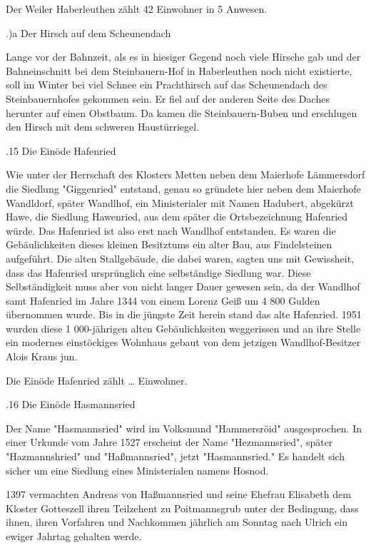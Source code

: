Der Weiler Haberleuthen zählt 42 Einwohner in 5 Anwesen.

.)a Der Hirsch auf dem Scheunendach

Lange vor der Bahnzeit, als es in hiesiger Gegend noch viele Hirsche gab und der
Bahneinschnitt bei dem Steinbauern-Hof in Haberleuthen noch nicht existierte,
soll im Winter bei viel Schnee ein Prachthirsch auf das Scheunendach des
Steinbauernhofes gekommen sein. Er fiel auf der anderen Seite des Daches
herunter auf einen Obstbaum. Da kamen die Steinbauern-Buben und erschlugen den
Hirsch mit dem schweren Haustürriegel.

.15 Die Einöde Hafenried

Wie unter der Herrschaft des Klosters Metten neben dem Maierhofe Lämmersdorf die
Siedlung "Giggenried" entstand, genau so gründete hier neben dem Maierhofe
Wandldorf, später Wandlhof, ein Ministerialer mit Namen Hadubert, abgekürzt
Hawe, die Siedlung Hawenried, aus dem später die Ortsbezeichnung Hafenried
würde. Das Hafenried ist also erst nach Wandlhof entstanden. Es waren die
Gebäulichkeiten dieses kleinen Besitztums ein alter Bau, aus Findelsteinen
aufgeführt. Die alten Stallgebäude, die dabei waren, sagten uns mit Gewissheit,
dass das Hafenried ursprünglich eine selbständige Siedlung war. Diese
Selbständigkeit muss aber von nicht langer Dauer gewesen sein, da der Wandlhof
samt Hafenried im Jahre 1344 von einem Lorenz Geiß um 4 800 Gulden übernommen
wurde. Bis in die jüngste Zeit herein stand das alte Hafenried. 1951 wurden
diese 1 000-jährigen alten Gebäulichkeiten weggerissen und an ihre Stelle ein
modernes einstöckiges Wohnhaus gebaut von dem jetzigen Wandlhof-Besitzer Alois
Kraus jun.

Die Einöde Hafenried zählt … Einwohner.

.16 Die Einöde Hasmannsried

Der Name "Hasmannsried" wird im Volksmund "Hammersröid" ausgesprochen. In einer
Urkunde vom Jahre 1527 erscheint der Name "Hezmannsried", später "Hazmannshried"
und "Haßmannsried", jetzt "Hasmannsried." Es handelt sich sicher um eine
Siedlung eines Ministerialen namens Hosnod.

1397 vermachten Andreas von Haßmannsried und seine Ehefrau Elisabeth dem Kloster
Gotteszell ihren Teilzehent zu Poitmannsgrub unter der Bedingung, dass ihnen,
ihren Vorfahren und Nachkommen jährlich am Sonntag nach Ulrich ein ewiger
Jahrtag gehalten werde.

